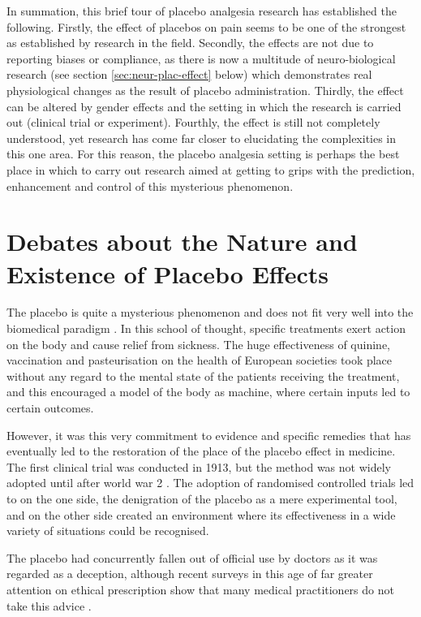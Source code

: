 In summation, this brief tour of placebo analgesia research has established the following. Firstly, the effect of placebos on pain seems to be one of the strongest as established by research in the field. Secondly, the effects are not due to reporting biases or compliance, as there is now a multitude of neuro-biological research (see section \ref{sec:neur-plac-effect} below) which demonstrates real physiological changes as the result of placebo administration.  Thirdly, the effect can be altered by gender effects and the setting in which the research is carried out (clinical trial or experiment). Fourthly, the effect is still not completely understood, yet research has come far closer to elucidating the complexities in this one area. For this reason, the placebo analgesia setting is perhaps the best place in which to carry out research aimed at getting to grips with the prediction, enhancement and control of this mysterious phenomenon. 


\section{Debates about the Nature and Existence of Placebo Effects}

The placebo is quite a mysterious phenomenon and does not fit very well into the biomedical paradigm \cite{Kaptchuk1998}. In this school of thought, specific treatments exert action on the body and cause relief from sickness. The huge effectiveness of quinine, vaccination and pasteurisation on the health of European societies took place without any regard to the mental state of the patients receiving the treatment, and this encouraged a model of the body as machine, where certain inputs led to certain outcomes. 

However, it was this very commitment to evidence and specific remedies that has eventually led to the restoration of the place of the placebo effect in medicine. The first clinical trial was conducted in 1913, but the method was not widely adopted until after world war 2 \cite{Kaptchuk1998}. The adoption of randomised controlled trials led to on the one side, the denigration of the placebo as a mere experimental tool, and on the other side created an environment where its effectiveness in a wide variety of situations could be recognised. 

The placebo had concurrently fallen out of official use  by doctors as it was regarded as a deception, although recent surveys in this age of far greater attention on ethical prescription show that many medical practitioners do not take this advice \cite{hrobjartsson2003use,sherman2008academic,tilburt2008prescribing,Sherman2008,Sherman2008a,Sherman2008b,Sherman2003,Ross1983,Buckalew1981,Krugman1964,Ross1962}. %

